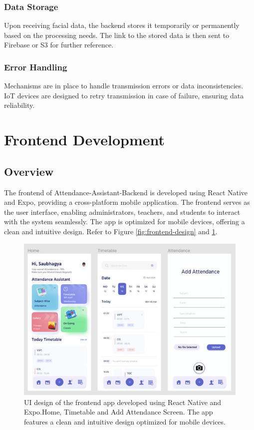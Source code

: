 \documentclass[conference]{IEEEtran}
\begin{document}
\subsubsection{Data Storage}
Upon receiving facial data, the backend stores it temporarily or permanently based on the processing needs. The link to the stored data is then sent to Firebase or S3 for further reference.

\subsubsection{Error Handling}
Mechanisms are in place to handle transmission errors or data inconsistencies. IoT devices are designed to retry transmission in case of failure, ensuring data reliability.

\section{Frontend Development}
\subsection{Overview}
The frontend of Attendance-Assistant-Backend is developed using React Native and Expo, providing a cross-platform mobile application. The frontend serves as the user interface, enabling administrators, teachers, and students to interact with the system seamlessly. The app is optimized for mobile devices, offering a clean and intuitive design. Refer to Figure \ref{fig:frontend-design} and \ref{fig:frontend-design2}.

\begin{figure}
    \centering
    \includegraphics[width=.85\textwidth]{app 2.jpg}
    \caption{UI design of the frontend app developed using React Native and Expo.Home, Timetable and Add Attendance Screen. The app features a clean and intuitive design optimized for mobile devices.}
    \label{fig:frontend-design2}
\end{figure}
\end{document}
